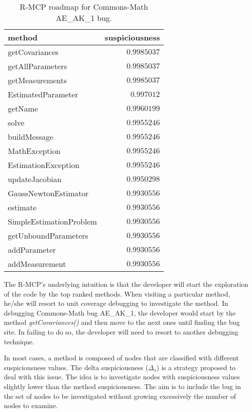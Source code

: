 \begin{table}[h]
\center
  \caption{R-MCP roadmap for Commons-Math AE\_AK\_1 bug.}
  \label{tab:rmcp-commons}
  \begin{tabular}{l|r}
    \hline \textbf{method} & \textbf{suspiciousness} \\
    \hline %
    {getCovariances} & {$0.9985037$} \\
    \hline getAllParameters & $0.9985037$ \\
    \hline getMeasurements & $0.9985037$ \\
    \hline EstimatedParameter & $0.997012$ \\
    \hline getName & $0.9960199$ \\
    \hline solve & $0.9955246$ \\
    \hline buildMessage & $0.9955246$ \\
    \hline MathException & $0.9955246$ \\
    \hline EstimationException & $0.9955246$ \\
    \hline updateJacobian & $0.9950298$ \\
    \hline GaussNewtonEstimator & $0.9930556$ \\
    \hline estimate & $0.9930556$ \\
    \hline SimpleEstimationProblem & $0.9930556$ \\
    \hline getUnboundParameters & $0.9930556$ \\
    \hline addParameter & $0.9930556$ \\
    \hline addMeasurement & $0.9930556$ \\
    \hline
  \end{tabular}
\end{table}

The R-MCP's underlying intuition is that the developer will start the
exploration of the code by the top ranked methods. When visiting a particular
method, he/she will resort to unit coverage debugging to investigate the method.
In debugging Commons-Math bug  AE\_AK\_1, the developer would start by the
method \textit{getCovariances()} and then move to the next ones until finding
the bug site. In failing to do so, the developer will need to resort to another
debugging technique.

In most cases, a method is composed of nodes that are classified with different
suspiciousness values.
The delta suspiciousness ($\Delta_{s}$) is a strategy proposed to deal with this
issue. The idea is  to investigate nodes with suspiciousness values slightly
lower than the method suspiciousness. The aim is to include  the bug in the set
of nodes to be investigated without growing excessively the number of nodes to
examine.

